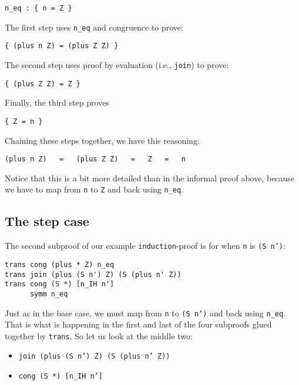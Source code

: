 \documentclass{book}[12pt]
\begin{document}
\begin{verbatim}
n_eq : { n = Z }
\end{verbatim}

\noindent The first step uses \texttt{n\_eq} and congruence to prove:

\begin{verbatim}
{ (plus n Z) = (plus Z Z) }
\end{verbatim}

\noindent The second step uses proof by evaluation (i.e., \texttt{join})
to prove:

\begin{verbatim}
{ (plus Z Z) = Z }
\end{verbatim}

\noindent Finally, the third step proves

\begin{verbatim}
{ Z = n }
\end{verbatim}

\noindent Chaining these steps together, we have this reasoning:

\begin{verbatim}
(plus n Z)   =   (plus Z Z)   =   Z   =   n
\end{verbatim}

\noindent Notice that this is a bit more detailed than in the informal proof above,
because we have to map from \texttt{n} to \texttt{Z} and back using \texttt{n\_eq}.

\subsection{The step case}

The second subproof of our example \texttt{induction}-proof is for when \texttt{n}
is \texttt{(S n')}:

\begin{verbatim}
trans cong (plus * Z) n_eq
trans join (plus (S n') Z) (S (plus n' Z))
trans cong (S *) [n_IH n']
      symm n_eq
\end{verbatim}

\noindent Just as in the base case, we must map from \texttt{n} to \texttt{(S n')} and back
using \texttt{n\_eq}.  That is what is happening in the first and last of the four subproofs
glued together by \texttt{trans}.  So let us look at the middle two:

\begin{itemize}
\item \texttt{join (plus (S n') Z) (S (plus n' Z))}
\item \texttt{cong (S *) [n\_IH n']}
\end{itemize}
\end{document}
